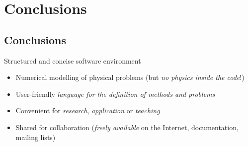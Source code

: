 

\begin{slide}


\begin{center}
\end{center}

\end{slide}

\part{Conclusions}

\chapter{Conclusions}

\begin{slide}

\begin{slideitemize}
\item Structured and concise software environment
\begin{itemize}
\item Numerical modelling of physical problems (but \emph{no physics inside the code}!)
\item User-friendly \emph{language for the definition of methods and problems}
\item Convenient for \emph{research}, \emph{application} or \emph{teaching}
\item Shared for collaboration (\emph{freely available} on the Internet,
documentation, mailing lists)
\end{itemize}
\end{slideitemize}

\end{slide}

